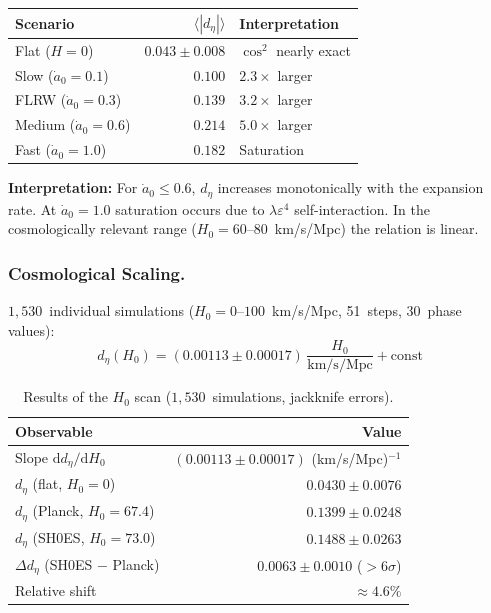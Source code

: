 \documentclass[12pt]{iopart}
\begin{document}
	\begin{center}
		\begin{tabular}{lrl}
			\hline
			\textbf{Scenario}
			& $\langle|d_\eta|\rangle$
			& \textbf{Interpretation} \\
			\hline
			Flat ($H = 0$)
			& $0.043 \pm 0.008$
			& $\cos^2$ nearly exact \\
			Slow ($\dot{a}_0 = 0.1$)
			& $0.100$
			& $2.3\times$ larger \\
			FLRW ($\dot{a}_0 = 0.3$)
			& $0.139$
			& $3.2\times$ larger \\
			Medium ($\dot{a}_0 = 0.6$)
			& $0.214$
			& $5.0\times$ larger \\
			Fast ($\dot{a}_0 = 1.0$)
			& $0.182$
			& Saturation \\
			\hline
		\end{tabular}
	\end{center}
	
	\noindent
	\textbf{Interpretation:}
	For $\dot{a}_0 \leq 0.6$, $d_\eta$ increases monotonically
	with the expansion rate. At $\dot{a}_0 = 1.0$ saturation
	occurs due to $\lambda\varepsilon^4$ self-interaction.
	In the cosmologically relevant range
	($H_0 = 60$--$80$~km/s/Mpc) the relation is linear.
	
	\subsubsection{Cosmological Scaling.}
	
	$1{,}530$~individual simulations
	($H_0 = 0$--$100$~km/s/Mpc, 51~steps,
	30~phase values):
	\begin{equation}
		d_\eta(H_0) = (0.00113 \pm 0.00017)\,
		\frac{H_0}{\mathrm{km/s/Mpc}}
		+ \mathrm{const}
		\label{eq:d_eta_h0}
	\end{equation}
	
	\begin{table}[ht]
		\centering
		\caption{Results of the $H_0$ scan
			($1{,}530$~simulations,
			jackknife errors).}
		\label{tab:h0_scan}
		\begin{tabular}{lr}
			\hline
			\textbf{Observable}
			& \textbf{Value} \\
			\hline
			Slope $\mathrm{d}d_\eta
			/ \mathrm{d}H_0$
			& $(0.00113 \pm 0.00017)$
			(km/s/Mpc)$^{-1}$ \\
			$d_\eta$ (flat, $H_0 = 0$)
			& $0.0430 \pm 0.0076$ \\
			$d_\eta$ (Planck, $H_0 = 67.4$)
			& $0.1399 \pm 0.0248$ \\
			$d_\eta$ (SH0ES, $H_0 = 73.0$)
			& $0.1488 \pm 0.0263$ \\
			$\Delta d_\eta$ (SH0ES $-$ Planck)
			& $0.0063 \pm 0.0010$
			($>6\sigma$) \\
			Relative shift
			& $\approx 4.6\%$ \\
			\hline
		\end{tabular}
	\end{table}
	
\end{document}
